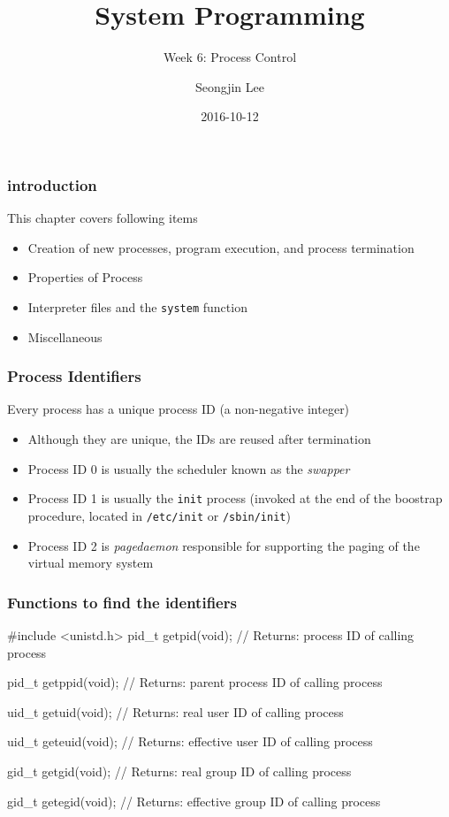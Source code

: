 \documentclass[newPxFont,sthlmFooter,nooffset]{beamer}
\title{System Programming}
\subtitle{Week 6: Process Control}
\author[SJL]{Seongjin Lee}
\institute{\href{mailto:insight@hanyang.ac.kr}{insight@hanyang.ac.kr}\\\url{http://esos.hanyang.ac.kr}\\Esos Lab. Hanyang University}
\date{2016-10-12}
\begin{document}
\frame[plain]{\titlepage} 






\begin{frame}[t]
  \frametitle{introduction}
This chapter covers following items
  \begin{itemize}
  \item Creation of new processes, program execution, and process termination
  \item Properties of Process
  \item Interpreter files and the \texttt{system} function
  \item Miscellaneous
  \end{itemize}

\end{frame}


\begin{frame}[t]
  \frametitle{Process Identifiers}
Every process has a unique process ID (a non-negative integer)
\begin{itemize}
\item Although they are unique, the IDs are reused after termination
\item Process ID 0 is usually the scheduler known as the \textit{swapper}
\item Process ID 1 is usually the \texttt{init} process (invoked at the end of the boostrap procedure, located in \texttt{/etc/init} or \texttt{/sbin/init})
\item Process ID 2 is \textit{pagedaemon} responsible for supporting the paging of the virtual memory system
\end{itemize}
\end{frame}

\begin{frame}[containsverbatim,t]
  \frametitle{Functions to find the identifiers}
\begin{codedef}
#include <unistd.h>
pid_t getpid(void);
// Returns: process ID of calling process

pid_t getppid(void);
// Returns: parent process ID of calling process

uid_t getuid(void);
// Returns: real user ID of calling process

uid_t geteuid(void);
// Returns: effective user ID of calling process

gid_t getgid(void);
// Returns: real group ID of calling process

gid_t getegid(void);
// Returns: effective group ID of calling process  
\end{codedef}
\end{frame}
\end{document}

